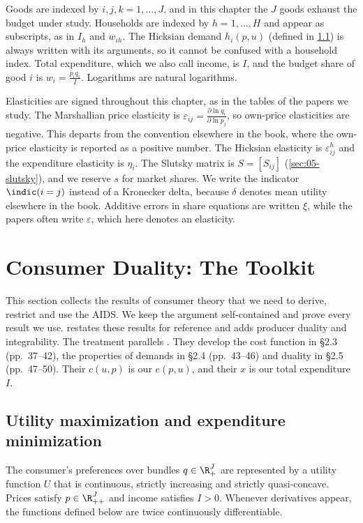 Goods are indexed by $i, j, k = 1, \dots, J$, and in this chapter the $J$ goods exhaust the budget under
study. Households are indexed by $h = 1, \dots, H$ and appear as subscripts, as in $I_h$ and $w_{ih}$. The
Hicksian demand $h_i(p, u)$ (defined in \cref{sec:05-ump-emp}) is always written with its arguments, so it cannot be confused with a household
index. Total expenditure, which we also call income, is $I$, and the budget share of good $i$ is
$w_i = \frac{p_iq_i}{I}$. Logarithms are natural logarithms.

Elasticities are signed throughout this chapter, as in the tables of the papers we study. The Marshallian
price elasticity is $\varepsilon_{ij} = \frac{\partial\ln q_i}{\partial\ln p_j}$, so own-price elasticities
are negative. This departs from the convention elsewhere in the book, where the own-price elasticity is
reported as a positive number. The Hicksian elasticity is $\varepsilon^h_{ij}$ and the expenditure
elasticity is $\eta_i$. The Slutsky matrix is $S = [S_{ij}]$ (\cref{sec:05-slutsky}), and we reserve $s$ for market shares. We write
the indicator $\indic(i = j)$ instead of a Kronecker delta, because $\delta$ denotes mean utility elsewhere
in the book. Additive errors in share equations are written $\xi$, while the papers often write
$\varepsilon$, which here denotes an elasticity.

\section{Consumer Duality: The Toolkit}\label{sec:05-duality}

This section collects the results of consumer theory that we need to derive, restrict and use the AIDS.
We keep the argument self-contained and prove every result we use.  restates these results for
reference and adds producer duality and integrability. The treatment parallels \citet[ch.~2]{DeatonMuellbauer1980b}. They develop the cost
function in \S 2.3 (pp.~37--42), the properties of demands in \S 2.4 (pp.~43--46) and duality in \S 2.5
(pp.~47--50). Their $c(u, p)$ is our $e(p, u)$, and their $x$ is our total expenditure $I$.

\subsection{Utility maximization and expenditure minimization}\label{sec:05-ump-emp}

\begin{assumption}[Preferences]\label{ass:05-prefs}
The consumer's preferences over bundles $q \in \R^J_+$ are represented by a utility function $U$ that is
continuous, strictly increasing and strictly quasi-concave. Prices satisfy $p \in \R^J_{++}$ and income
satisfies $I > 0$. Whenever derivatives appear, the functions defined below are twice continuously
differentiable.
\end{assumption}

